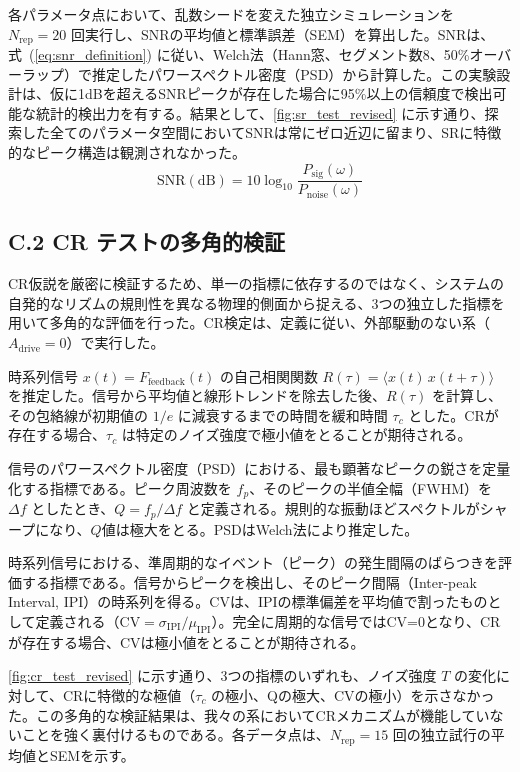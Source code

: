 \documentclass[a4paper,11pt,ja=standard,lualatex]{bxjsarticle}
\newcommand{\figref}[1]{\cref{#1}}
\newcommand{\eqnref}[1]{式~(\ref{#1})}
\begin{document}
各パラメータ点において、乱数シードを変えた独立シミュレーションを $N_{\mathrm{rep}}=20$ 回実行し、SNRの平均値と標準誤差（SEM）を算出した。SNRは、\eqnref{eq:snr_definition} に従い、Welch法（Hann窓、セグメント数8、50\%オーバーラップ）で推定したパワースペクトル密度（PSD）から計算した。この実験設計は、仮に1dBを超えるSNRピークが存在した場合に95\%以上の信頼度で検出可能な統計的検出力を有する。結果として、\figref{fig:sr_test_revised} に示す通り、探索した全てのパラメータ空間においてSNRは常にゼロ近辺に留まり、SRに特徴的なピーク構造は観測されなかった。
\begin{equation}
 \mathrm{SNR}(\mathrm{dB}) = 10\log_{10}\frac{P_{\mathrm{sig}}(\omega)}{P_{\mathrm{noise}}(\omega)}
 \label{eq:snr_definition}
\end{equation}

\subsection*{C.2 CR テストの多角的検証}
CR仮説を厳密に検証するため、単一の指標に依存するのではなく、システムの自発的なリズムの規則性を異なる物理的側面から捉える、3つの独立した指標を用いて多角的な評価を行った。CR検定は、定義に従い、外部駆動のない系（$A_{\mathrm{drive}}=0$）で実行した。

時系列信号 $x(t) = F_{\mathrm{feedback}}(t)$ の自己相関関数 $R(\tau)=\langle x(t)\,x(t+\tau)\rangle$ を推定した。信号から平均値と線形トレンドを除去した後、$R(\tau)$ を計算し、その包絡線が初期値の $1/e$ に減衰するまでの時間を緩和時間 $\tau_c$ とした。CRが存在する場合、$\tau_c$ は特定のノイズ強度で極小値をとることが期待される。

信号のパワースペクトル密度（PSD）における、最も顕著なピークの鋭さを定量化する指標である。ピーク周波数を $f_p$、そのピークの半値全幅（FWHM）を $\Delta f$ としたとき、$Q = f_p / \Delta f$ と定義される。規則的な振動ほどスペクトルがシャープになり、$Q$値は極大をとる。PSDはWelch法により推定した。

時系列信号における、準周期的なイベント（ピーク）の発生間隔のばらつきを評価する指標である。信号からピークを検出し、そのピーク間隔（Inter-peak Interval, IPI）の時系列を得る。CVは、IPIの標準偏差を平均値で割ったものとして定義される（$\mathrm{CV} = \sigma_{\mathrm{IPI}} / \mu_{\mathrm{IPI}}$）。完全に周期的な信号ではCV=0となり、CRが存在する場合、CVは極小値をとることが期待される。

\figref{fig:cr_test_revised} に示す通り、3つの指標のいずれも、ノイズ強度 $T$ の変化に対して、CRに特徴的な極値（$\tau_c$ の極小、Qの極大、CVの極小）を示さなかった。この多角的な検証結果は、我々の系においてCRメカニズムが機能していないことを強く裏付けるものである。各データ点は、$N_{\mathrm{rep}}=15$ 回の独立試行の平均値とSEMを示す。
\end{document}

